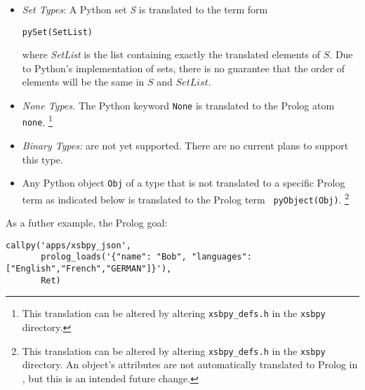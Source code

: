\begin{description}
\begin{itemize}
         {\tt pyDict(DictList)}

         where {\tt DictList} is a list of tuples in term form: 

         {\tt ''(Key,Value)}

         where {\tt Key} and {\tt Value} are the translations of any
         Python data structures that are both allowable as a
         dictionary key or value, and supported by {\tt xsbpy}.  For
         instance, {\tt Value} can be (the term form of) a list, a
         set, a tuple or another dictionary.

       \item {\em Set Types}: A Python set {\em S} is translated to
         the term form

         {\tt pySet(SetList)}

         where {\em SetList} is the list containing exactly the
         translated elements of $S$.  Due to Python's implementation
         of sets, there is no guarantee that the order of elements
         will be the same in $S$ and $SetList$.
       \item {\em None Types.} The Python keyword {\tt None} is
         translated to the Prolog atom {\tt none}. \footnote{This
           translation can be altered by altering {\tt xsbpy\_defs.h}
           in the {\tt xsbpy} directory.}
       \item {\em Binary Types:} are not yet supported.  There are no
         current plans to support this type.
     \item Any Python object {\tt Obj} of a type that is not
       translated to a specific Prolog term as indicated below is
       translated to the Prolog term {\tt
         pyObject(Obj)}. \footnote{This translation can be altered by
         altering {\tt xsbpy\_defs.h} in the {\tt xsbpy} directory. An
         object's attributes are not automatically translated to
         Prolog in \xsbpyversion{}, but this is an intended future
         change.}
     \end{itemize}

 As a futher example, the Prolog goal:

 \begin{verbatim}
callpy('apps/xsbpy_json',
       prolog_loads('{"name": "Bob", "languages": ["English","French","GERMAN"]}'),
       Ret)
\end{verbatim}
 

\end{description}
